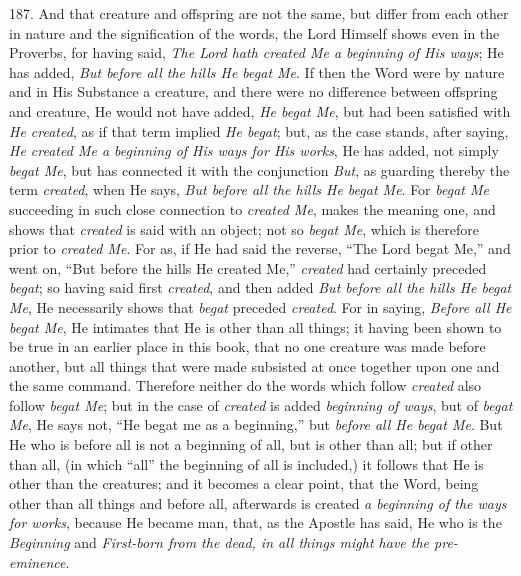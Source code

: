 187. And that creature and
offspring are not the same, but differ from each other in nature and
the signification of the words, the Lord Himself shows even in the
Proverbs, for having said, \emph{The Lord hath created Me a beginning of
His ways}; He has added, \emph{But before all the hills He begat Me}.
If then the Word were by nature and in His Substance a creature, and
there were no difference between offspring and creature, He would not
have added, \emph{He begat Me}, but had been satisfied with \emph{He
created}, as if that term implied \emph{He begat}; but, as the case
stands, after saying, \emph{He created Me a beginning of His ways for His
works}, He has added, not simply \emph{begat Me}, but has
connected it with the conjunction \emph{But}, as guarding thereby the
term \emph{created}, when He says, \emph{But before all the hills He
begat Me}. For \emph{begat Me} succeeding in such close connection
to \emph{created Me}, makes the meaning one, and shows that \emph{created}
is said with an object; not so \emph{begat Me}, which is therefore
prior to \emph{created Me}. For as, if He had said the reverse, ``The
Lord begat Me,'' and went on, ``But before the hills He created Me,'' \emph{created}
had certainly preceded \emph{begat}; so having said first \emph{created},
and then added \emph{But before all the hills He begat Me}, He
necessarily shows that \emph{begat} preceded \emph{created}. For in
saying, \emph{Before all He begat Me}, He intimates that He is other
than all things; it having been shown to be true in an earlier place
in this book, that no one creature was made before another, but all
things that were made subsisted at once together upon one and the same
command. Therefore neither do the words which follow \emph{created}
also follow \emph{begat Me}; but in the case of \emph{created} is
added \emph{beginning of ways}, but of \emph{begat Me}, He says not, ``He
begat me as a beginning,'' but \emph{before all He begat Me}. But He
who is before all is not a beginning of all, but is other than all;
but if other than all, (in which ``all'' the beginning of all is
included,) it follows that He is other than the creatures; and it
becomes a clear point, that the Word, being other than all things and
before all, afterwards is created \emph{a beginning of the ways for works},
because He became man, that, as the Apostle has said, He who is the \emph{Beginning}
and \emph{First-born from the dead, in all things might have the
pre-eminence}.

